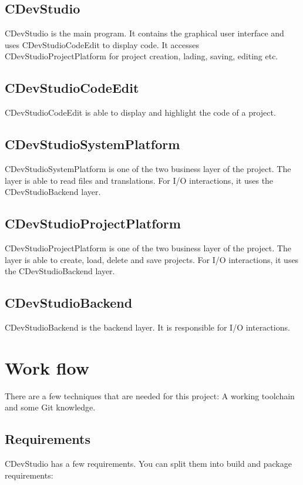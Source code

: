 \documentclass{article}
\begin{document}
\subsection{CDevStudio}
CDevStudio is the main program. It contains the graphical user interface and uses CDevStudioCodeEdit to display code. It accesses CDevStudioProjectPlatform for project creation, lading, saving, editing etc.

\subsection{CDevStudioCodeEdit}
CDevStudioCodeEdit is able to display and highlight the code of a project.

\subsection{CDevStudioSystemPlatform}
CDevStudioSystemPlatform is one of the two business layer of the project. The layer is able to read files and translations. For I/O interactions, it uses the CDevStudioBackend layer.

\subsection{CDevStudioProjectPlatform}
CDevStudioProjectPlatform is one of the two business layer of the project. The layer is able to create, load, delete and save projects. For I/O interactions, it uses the CDevStudioBackend layer.

\subsection{CDevStudioBackend}
CDevStudioBackend is the backend layer. It is responsible for I/O interactions.

\section{Work flow}
There are a few techniques that are needed for this project: A working toolchain and some Git knowledge.

\subsection{Requirements}
CDevStudio has a few requirements. You can split them into build and package requirements:
\end{document}

